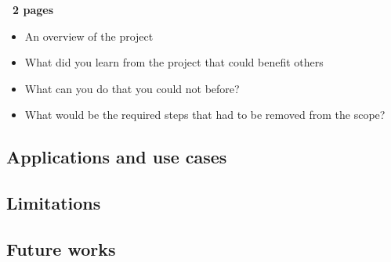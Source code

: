 \textbf{~2 pages}
\begin{itemize}
    \item An overview of the project
    \item What did you learn from the project that could benefit others
    \item What can you do that you could not before?
    \item What would be the required steps that had to be removed from the scope?
\end{itemize}

\subsection{Applications and use cases}
\subsection{Limitations}
\subsection{Future works}
